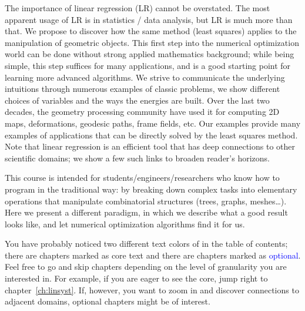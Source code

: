 \documentclass[notitlepage,oneside]{book}
\begin{document}
The importance of linear regression (LR) cannot be overstated. The most apparent usage of LR is in statistics / data analysis, but LR is much more than that.
We propose to discover how the same method (least squares) applies to the manipulation of geometric objects.
This first step into the numerical optimization world can be done without strong applied mathematics background;
while being simple, this step suffices for many applications, and is a good starting point for learning more advanced algorithms.
We strive to communicate the underlying intuitions through numerous examples of classic problems, we show different choices of variables and the ways the energies are built.
Over the last two decades, the geometry processing community have used it for computing 2D maps, deformations, geodesic paths, frame fields, etc.
Our examples provide many examples of applications that can be directly solved by the least squares method.
Note that linear regression is an efficient tool that has deep connections to other scientific domains;
we show a few such links to broaden reader's horizons.

\vspace{3mm}

This course is intended for students/engineers/researchers who know how to program in the traditional way:
by breaking down complex tasks into elementary operations that manipulate combinatorial structures (trees, graphs, meshes\dots).
Here we present a different paradigm, in which we describe what a good result looks like, and let numerical optimization algorithms find it for us.

\vspace{3mm}

You have probably noticed two different text colors of in the table of contents; there are chapters marked as \textcolor{ao(english)}{core text} and there are chapters marked as \textcolor{blue}{optional}.
Feel free to go and skip chapters depending on the level of granularity you are interested in.
For example, if you are eager to see the core, jump right to chapter~\ref{ch:linsyst}.
If, however, you want to zoom in and discover connections to adjacent domains, optional chapters might be of interest.

\iffalse
\end{document}
